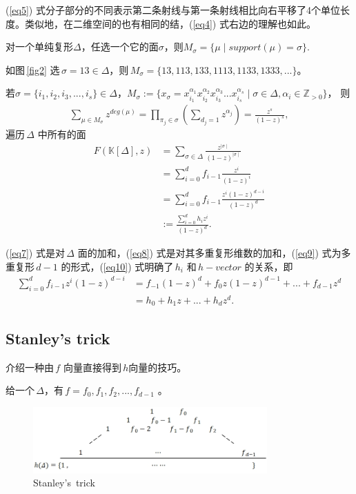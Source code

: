 (\ref{eq5}) 式分子部分的不同表示第二条射线与第一条射线相比向右平移了4个单位长度。类似地，在二维空间的也有相同的结，(\ref{eq4}) 式右边的理解也如此。

\begin{df}
对一个单纯复形$\Delta$，任选一个它的面$\sigma$，则$M_{\sigma}=\{\mu \mid support(\mu)=\sigma\}$.
\end{df}

如图\,\ref{fig2} 选\,$\sigma=13\in\Delta$，则\,$M_{\sigma}=\{13, 113, 133, 1113, 1133, 1333,...\}$。

\begin{theoreminner}
若$\sigma=\{i_{1},i_{2},i_{3},...,i_{s}\}\in \Delta$，$M_{\sigma}:=\{x_{\sigma}=x^{\alpha_{1}}_{i_{1}}x^{\alpha_{2}}_{i_{2}}x^{\alpha_{3}}_{i_{3}}...x^{\alpha_{s}}_{i_{s}}\mid\sigma\in\Delta,\alpha_{i}\in\mathbb{Z}_{>0}\}$，
则
\begin{align}
\sum_{\mu\in M_{\sigma}}z^{deg(\mu)}=\prod_{\pi_{j}\in\sigma}(\sum_{d_{j}=1}z^{\alpha_{j}})=\frac{z^{s}}{(1-z)^{s}},
\label{eq6}
\end{align}
遍历\,$\Delta$ 中所有的面
\begin{align}
F(\mathbb{K}[\Delta],z)&=\sum_{\sigma\in\Delta}\frac{z^{\mid\sigma\mid}}{(1-z)^{\mid\sigma\mid}} \label{eq7}\\
&=\sum_{i=0}^{d}f_{i-1}\frac{z^{i}}{(1-z)^{i}} \label{eq8}\\
&=\sum_{i=0}^{d}f_{i-1}\frac{z^{i}(1-z)^{d-i}}{(1-z)^{d}} \label{eq9}\\
&:=\frac{\sum_{i=0}^{d}h_{i}z^{i}}{(1-z)^{d}}.
\label{eq10}
\end{align}
\end{theoreminner}

(\ref{eq7}) 式是对\,$\Delta$ 面的加和，(\ref{eq8}) 式是对其多重复形维数的加和，(\ref{eq9}) 式为多重复形\,$d-1$ 的形式，(\ref{eq10}) 式明确了\,$h_{i}$ 和\,$h-vector$ 的关系，即
\begin{align}
\sum_{i=0}^{d}f_{i-1}z^{i}(1-z)^{d-i}&=f_{-1}(1-z)^{d}+f_{0}z(1-z)^{d-1}+...+f_{d-1}z^{d}\nonumber \\[0.5ex]
&=h_{0}+h_{1}z+...+h_{d}z^{d}. \label{eq11}
\end{align}

\subsection{Stanley's  trick }
介绍一种由\,$f$ 向量直接得到\,$h$向量的技巧。\\

\begin{df}
给一个\,$\Delta$，有\,$f={f_{0},f_{1},f_{2},...,f_{d-1}}$ 。\par
\begin{figure}[h]
\centering
\includegraphics[width=0.8\textwidth]{tupianwu.png}
\caption{Stanley's \,trick}
\label{fig4}
\end{figure}
\end{df}

